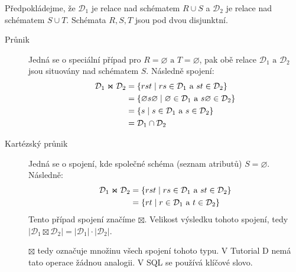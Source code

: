 Předpokládejme, že $\mathcal{D}_{1}$ je relace nad schématem $R \cup S$ a $\mathcal{D}_{2}$ je relace nad schématem $S \cup T$. Schémata $R, S, T$ jsou pod dvou disjunktní. 
\begin{description}
\item[Průnik] Jedná se o speciální případ pro $R = \varnothing \text{ a } T = \varnothing$, pak obě relace $\mathcal{D}_{1} \text{ a } \mathcal{D}_{2}$ jsou situovány nad schématem $S$. Následně spojení:
\begin{align*}
\mathcal{D}_{1} \Join \mathcal{D}_{2} &= \lbrace rst \thickspace | \thickspace rs \in \mathcal{D}_{1} \text{ a } st \in \mathcal{D}_{2} \rbrace \\
&= \lbrace \varnothing s \varnothing \thickspace | \thickspace \varnothing \in \mathcal{D}_{1} \text{ a } s \varnothing \in \mathcal{D}_{2} \rbrace \\
&= \lbrace s \thickspace | \thickspace s \in \mathcal{D}_{1} \text{ a } s \in \mathcal{D}_{2} \rbrace \\
&= \mathcal{D}_{1} \cap \mathcal{D}_{2}
\end{align*}

\item[Kartézský průnik] Jedná se o spojení, kde společné schéma (seznam atributů) $S = \varnothing$. Následně:
\begin{align*}
\mathcal{D}_{1} \Join \mathcal{D}_{2} &= \lbrace rst \thickspace | \thickspace rs \in \mathcal{D}_{1} \text{ a } st \in \mathcal{D}_{2} \rbrace \\
&= \lbrace rt \thickspace | \thickspace r \in \mathcal{D}_{1} \text{ a } t \in \mathcal{D}_{2} \rbrace
\end{align*}
Tento případ spojení značíme $\boxtimes$. Velikost výsledku tohoto spojení, tedy $| \mathcal{D}_{1} \boxtimes \mathcal{D}_{2} | = |\mathcal{D}_{1}| \cdot |\mathcal{D}_{2}|$.

$\boxtimes$ tedy označuje množinu všech spojení tohoto typu. V Tutorial D nemá tato operace žádnou analogii. V SQL se používá klíčové slovo.


\end{description}
